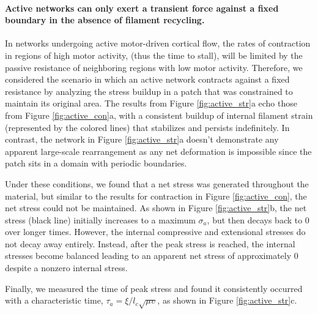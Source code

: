 \documentclass[10pt,letterpaper]{article}
\begin{document}
\paragraph{Active networks can only exert a transient force against a fixed boundary in the absence of filament recycling.}

In networks undergoing active motor-driven cortical flow, the rates of contraction in regions of high motor activity, (thus the time to stall), will be limited by the passive resistance of neighboring regions with low motor activity. Therefore, we considered the scenario in which an active network contracts against a fixed resistance by analyzing the stress buildup in a patch that was constrained to maintain its original area.  The results from Figure \ref{fig:active_str}a echo those from Figure \ref{fig:active_con}a, with a consistent buildup of internal filament strain (represented by the colored lines) that stabilizes and persists indefinitely.  In contrast, the network in Figure \ref{fig:active_str}a doesn't demonstrate any apparent large-scale rearrangement as any net deformation is impossible since the patch sits in a domain with periodic boundaries.

Under these conditions, we found that a net stress was generated throughout the material, but similar to the results for contraction in Figure \ref{fig:active_con}, the net stress could not be maintained.  As shown in Figure \ref{fig:active_str}b, the net stress (black line) initially increases to a maximum $\sigma_a$, but then decays back to 0 over longer times. However, the internal compressive and extensional stresses do not decay away entirely.  Instead, after the peak stress is reached, the internal stresses become balanced leading to an apparent net stress of approximately 0 despite a nonzero internal stress.  

Finally, we measured the time of peak stress and found it consistently occurred with a characteristic time, $\tau_a=\xi/l_c\sqrt{\mu\upsilon}$, as shown in Figure \ref{fig:active_str}c. 
\end{document}
